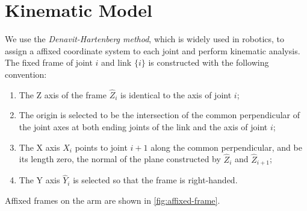 \documentclass{article}
\begin{document}
\section{Kinematic Model}

We use the \emph{Denavit-Hartenberg method}, which is widely used in robotics, to assign a affixed coordinate system to each joint and perform kinematic analysis.
The fixed frame of joint $i$ and link $\{i\}$ is constructed with the following convention:
\begin{enumerate}
    \item The Z axis of the frame $\hat Z_i$ is identical to the axis of joint $i$;
    \item The origin is selected to be the intersection of the common perpendicular of the joint axes at both ending joints of the link and the axis of joint $i$;
    \item The X axis $\hat X_i$ points to joint $i+1$ along the common perpendicular, and be its length zero, the normal of the plane constructed by $\hat Z_i$ and $\hat Z_{i+1}$;
    \item The Y axis $\hat Y_i$ is selected so that the frame is right-handed.
\end{enumerate}
Affixed frames on the arm are shown in \autoref{fig:affixed-frame}.


\end{document}
